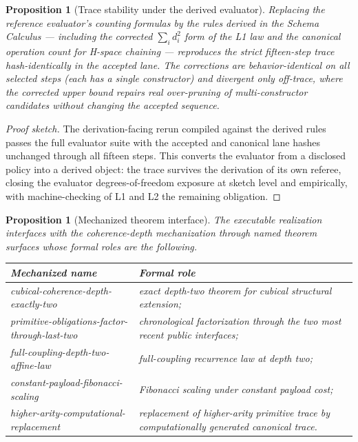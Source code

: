 \documentclass[11pt]{article}
\theoremstyle{plain}
\newtheorem{proposition}[theorem]{Proposition}
\theoremstyle{definition}
\theoremstyle{remark}
\newenvironment{proofsketch}{\begin{proof}[Proof sketch]}{\end{proof}}
\newcommand{\mname}[1]{\begingroup\ttfamily\footnotesize #1\endgroup}
\begin{document}
\begin{proposition}[Trace stability under the derived evaluator]
Replacing the reference evaluator's counting formulas by the rules derived in the Schema Calculus --- including the corrected \(\sum_i d_i^2\) form of the L1 law and the canonical operation count for H-space chaining --- reproduces the strict fifteen-step trace hash-identically in the accepted lane. The corrections are behavior-identical on all selected steps (each has a single constructor) and divergent only off-trace, where the corrected upper bound repairs real over-pruning of multi-constructor candidates without changing the accepted sequence.
\end{proposition}

\begin{proofsketch}
The derivation-facing rerun compiled against the derived rules passes the full evaluator suite with the accepted and canonical lane hashes unchanged through all fifteen steps. This converts the evaluator from a disclosed policy into a derived object: the trace survives the derivation of its own referee, closing the evaluator degrees-of-freedom exposure at sketch level and empirically, with machine-checking of L1 and L2 the remaining obligation.
\end{proofsketch}

\begin{proposition}[Mechanized theorem interface]
The executable realization interfaces with the coherence-depth mechanization through named theorem surfaces whose formal roles are the following.
\begin{center}
\small
\begin{tabularx}{\textwidth}{@{}>{\raggedright\arraybackslash}p{}Y@{}}
\toprule
Mechanized name & Formal role \\
\midrule
\mname{cubical-\allowbreak{}coherence-\allowbreak{}depth-\allowbreak{}exactly-\allowbreak{}two}
& exact depth-two theorem for cubical structural extension; \\
\mname{primitive-\allowbreak{}obligations-\allowbreak{}factor-\allowbreak{}through-\allowbreak{}last-\allowbreak{}two}
& chronological factorization through the two most recent public interfaces; \\
\mname{full-\allowbreak{}coupling-\allowbreak{}depth-\allowbreak{}two-\allowbreak{}affine-\allowbreak{}law}
& full-coupling recurrence law at depth two; \\
\mname{constant-\allowbreak{}payload-\allowbreak{}fibonacci-\allowbreak{}scaling}
& Fibonacci scaling under constant payload cost; \\
\mname{higher-\allowbreak{}arity-\allowbreak{}computational-\allowbreak{}replacement}
& replacement of higher-arity primitive trace by computationally generated canonical trace. \\
\bottomrule
\end{tabularx}
\end{center}
\end{proposition}
\end{document}
